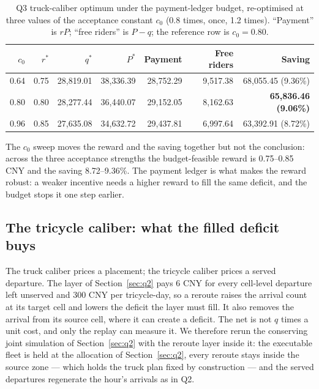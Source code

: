 \begin{table}[htbp]
\centering
\footnotesize
\caption[Q3 truck-caliber sensitivity]{Q3 truck-caliber optimum under the payment-ledger
budget, re-optimised at three values of the acceptance constant $c_0$ (0.8 times, once,
1.2 times). ``Payment'' is $rP$; ``free riders'' is $P-q$; the reference row is
$c_0=0.80$.}
\label{tab:q3c0}
\scriptsize
\begin{tabular}{@{}rrrrrrr@{}}
\toprule
$c_0$ & $r^*$ & $q^*$ & $P^*$ & \textbf{Payment} & \textbf{Free riders} &
\textbf{Saving} \\
\midrule
0.64 & 0.75 & 28,819.01 & 38,336.39 & 28,752.29 & 9,517.38 & 68,055.45 (9.36\%) \\
0.80 & 0.80 & 28,277.44 & 36,440.07 & 29,152.05 & 8,162.63 & \textbf{65,836.46 (9.06\%)} \\
0.96 & 0.85 & 27,635.08 & 34,632.72 & 29,437.81 & 6,997.64 & 63,392.91 (8.72\%) \\
\bottomrule
\end{tabular}
\end{table}

The $c_0$ sweep moves the reward and the saving together but not the conclusion: across
the three acceptance strengths the budget-feasible reward is 0.75--0.85 CNY and the
saving 8.72--9.36\%. The payment ledger is what makes the reward robust: a weaker
incentive needs a higher reward to fill the same deficit, and the budget stops it one
step earlier.

\subsection{The tricycle caliber: what the filled deficit buys}

The truck caliber prices a placement; the tricycle caliber prices a served departure.
The layer of Section~\ref{sec:q2} pays 6 CNY for every cell-level departure left
unserved and 300 CNY per tricycle-day, so a reroute raises the arrival count at its
target cell and lowers the deficit the layer must fill. It also removes the arrival
from its source cell, where it can create a deficit. The net is not $q$ times a unit
cost, and only the replay can measure it. We therefore rerun the conserving joint
simulation of Section~\ref{sec:q2} with the reroute layer inside it: the executable
fleet is held at the allocation of Section~\ref{sec:q2}, every reroute stays inside the
source zone --- which holds the truck plan fixed by construction --- and the served
departures regenerate the hour's arrivals as in Q2.

